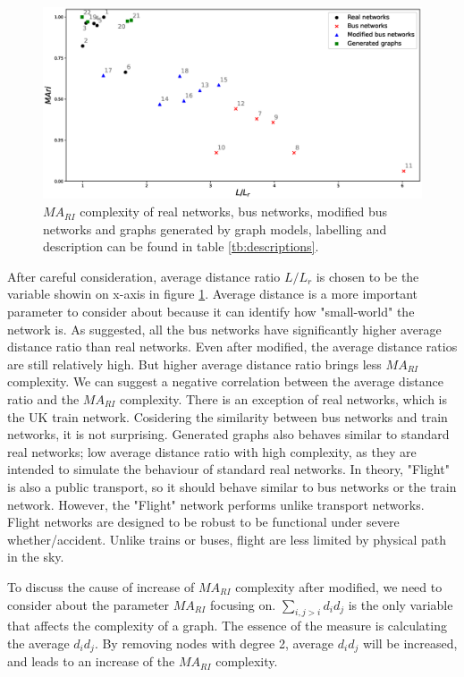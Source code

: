 \documentclass[12pt]{article}
\begin{document}
\begin{figure}[ht]
    \includegraphics[width = \textwidth]{real_networks.eps}
    \caption{$MA_{RI}$ complexity of real networks, bus networks, modified bus networks and graphs generated by graph models, labelling and description can be found in table \ref{tb:descriptions}.}
    \label{fig:real_networks}
\end{figure}
\par
After careful consideration, average distance ratio $L/L_r$ is chosen to be the variable showin on x-axis in figure \ref{fig:real_networks}. Average distance is a more important parameter to consider about because it can identify how "small-world" the network is. As suggested, all the bus networks have significantly higher average distance ratio than real networks. Even after modified, the average distance ratios are still relatively high. But higher average distance ratio brings less $MA_{RI}$ complexity. We can suggest a negative correlation between the average distance ratio and the $MA_{RI}$ complexity. There is an exception of real networks, which is the UK train network. Cosidering the similarity between bus networks and train networks, it is not surprising. Generated graphs also behaves similar to standard real networks; low average distance ratio with high complexity, as they are intended to simulate the behaviour of standard real networks. In theory, "Flight" is also a public transport, so it should behave similar to bus networks or the train network. However, the "Flight" network performs unlike transport networks. Flight networks are designed to be robust\cite{zhixing2021recent} to be functional under severe whether/accident. Unlike trains or buses, flight are less limited by physical path in the sky.\par
To discuss the cause of increase of $MA_{RI}$ complexity after modified, we need to consider about the parameter $MA_{RI}$ focusing on. $\sum_{i,j>i}d_id_j$ is the only variable that affects the complexity of a graph. The essence of the measure is calculating the average $d_id_j$. By removing nodes with degree 2, average $d_id_j$ will be increased, and leads to an increase of the $MA_{RI}$ complexity.
\end{document}
